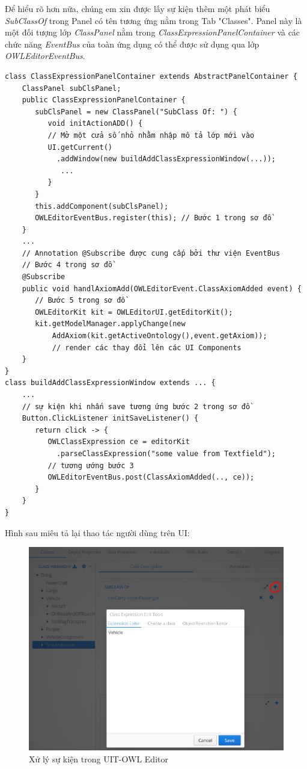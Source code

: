Để hiểu rõ hơn nữa, chúng em xin được lấy sự kiện thêm một phát biểu \textit{SubClassOf} trong Panel có tên tương ứng nằm trong Tab "Classes". Panel này là một đối tượng lớp \textit{ClassPanel} nằm trong \textit{ClassExpressionPanelContainer} và các chức năng \textit{EventBus} của toàn ứng dụng có thể được sử dụng qua lớp \textit{OWLEditorEventBus}. 
\begin{verbatim}
class ClassExpressionPanelContainer extends AbstractPanelContainer {
    ClassPanel subClsPanel; 
    public ClassExpressionPanelContainer {
       subClsPanel = new ClassPanel("SubClass Of: ") {
          void initActionADD() { 
          // Mở một cửa số nhỏ nhằm nhập mô tả lớp mới vào
          UI.getCurrent()
            .addWindow(new buildAddClassExpressionWindow(...));            
             ...
          }
       }
       this.addComponent(subClsPanel); 
	   OWLEditorEventBus.register(this); // Bước 1 trong sơ đồ
    }
    ...
    // Annotation @Subscribe được cung cấp bởi thư viện EventBus
    // Bước 4 trong sơ đồ 
    @Subscribe 
    public void handlAxiomAdd(OWLEditorEvent.ClassAxiomAdded event) {
       // Bước 5 trong sơ đồ
       OWLEditorKit kit = OWLEditorUI.getEditorKit();
       kit.getModelManager.applyChange(new 
           AddAxiom(kit.getActiveOntology(),event.getAxiom));
	       // render các thay đổi lên các UI Components
    }  
}
class buildAddClassExpressionWindow extends ... {
    ...
    // sự kiện khi nhấn save tương ứng bước 2 trong sơ đồ
    Button.ClickListener initSaveListener() {
       return click -> {
          OWLClassExpression ce = editorKit
            .parseClassExpression("some value from Textfield");
          // tương ướng bước 3 
          OWLEditorEventBus.post(ClassAxiomAdded(.., ce));
       }
    }
}
\end{verbatim}
Hình sau miêu tả lại thao tác người dùng trên UI:
\begin{figure}[h!]
	\centering
	\includegraphics[width=145mm]{Figures/eventBusExplain.png}
	\caption{Xử lý sự kiện trong UIT-OWL Editor\label{overflow}}
\end{figure}
